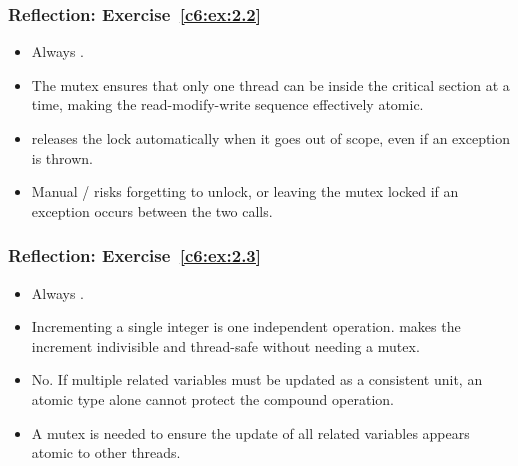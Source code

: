 \subsubsection{Reflection: Exercise~\ref{c6:ex:2.2}}
\begin{itemize}
  \item Always .
\end{itemize}

\begin{itemize}
  \item The mutex ensures that only one thread can be inside the critical section at a time, making
    the read-modify-write sequence effectively atomic.
\end{itemize}

\begin{itemize}
  \item {} releases the lock automatically when it goes out of scope, even if an
    exception is thrown.
  \item Manual / risks forgetting to unlock, or leaving the mutex locked
    if an exception occurs between the two calls.
\end{itemize}

\subsubsection{Reflection: Exercise~\ref{c6:ex:2.3}}
\begin{itemize}
  \item Always .
\end{itemize}

\begin{itemize}
  \item Incrementing a single integer is one independent operation.  makes the
    increment indivisible and thread-safe without needing a mutex.
\end{itemize}

\begin{itemize}
  \item No. If multiple related variables must be updated as a consistent unit, an atomic type
    alone cannot protect the compound operation.
  \item A mutex is needed to ensure the update of all related variables appears atomic to other
    threads.
\end{itemize}

